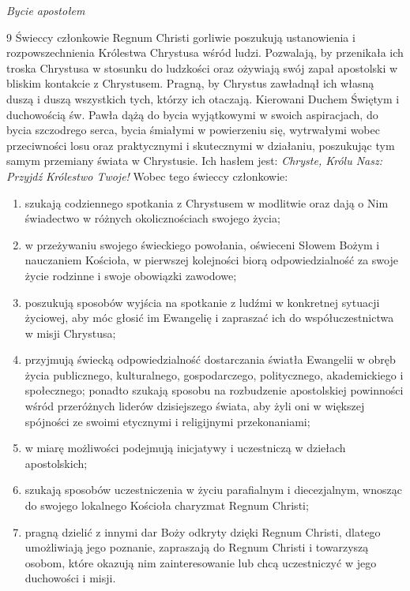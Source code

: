 ﻿\documentclass{report}
\newcommand{\lett}[1]{\lettrine[findent=6pt]{#1}{}}
\newcommand{\ssec}[1]{\vspace{1em}\textit{#1}\vspace{.5em}\nopagebreak}
\begin{document}
\ssec{Bycie apostołem}


\lett{9} Świeccy członkowie Regnum Christi gorliwie poszukują ustanowienia i rozpowszechnienia Królestwa Chrystusa wśród ludzi. Pozwalają, by przenikała ich troska Chrystusa w stosunku do ludzkości oraz ożywiają swój zapał apostolski w bliskim kontakcie z Chrystusem. Pragną, by Chrystus zawładnął ich własną duszą i duszą wszystkich tych, którzy ich otaczają. Kierowani Duchem Świętym i duchowością św. Pawła dążą do bycia wyjątkowymi w swoich aspiracjach, do bycia szczodrego serca, bycia śmiałymi w powierzeniu się, wytrwałymi wobec przeciwności losu oraz praktycznymi i skutecznymi w działaniu, poszukując tym samym przemiany świata w Chrystusie. Ich hasłem jest: {\em Chryste, Królu Nasz: Przyjdź Królestwo Twoje!} Wobec tego świeccy członkowie:


\begin{enumerate}


\item szukają codziennego spotkania z Chrystusem w modlitwie oraz dają o Nim świadectwo w różnych okolicznościach swojego życia;


\item w przeżywaniu swojego świeckiego powołania, oświeceni Słowem Bożym i nauczaniem Kościoła, w pierwszej kolejności biorą odpowiedzialność za swoje życie rodzinne i swoje obowiązki zawodowe;


\item poszukują sposobów wyjścia na spotkanie z ludźmi w konkretnej sytuacji życiowej, aby móc głosić im Ewangelię i zapraszać ich do współuczestnictwa w misji Chrystusa;


\item przyjmują świecką odpowiedzialność dostarczania światła Ewangelii w obręb życia publicznego, kulturalnego, gospodarczego, politycznego, akademickiego i społecznego; ponadto szukają sposobu na rozbudzenie apostolskiej powinności wśród przeróżnych liderów dzisiejszego świata, aby żyli oni w większej spójności ze swoimi etycznymi i religijnymi przekonaniami;


\item w miarę możliwości podejmują inicjatywy i uczestniczą w dziełach apostolskich;


\item szukają sposobów uczestniczenia w życiu parafialnym i diecezjalnym, wnosząc do swojego lokalnego Kościoła charyzmat Regnum Christi;


\item pragną dzielić z innymi dar Boży odkryty dzięki Regnum Christi, dlatego umożliwiają jego poznanie, zapraszają do Regnum Christi i towarzyszą osobom, które okazują nim zainteresowanie lub chcą uczestniczyć w jego duchowości i misji.


\end{enumerate}
 
\end{document}
